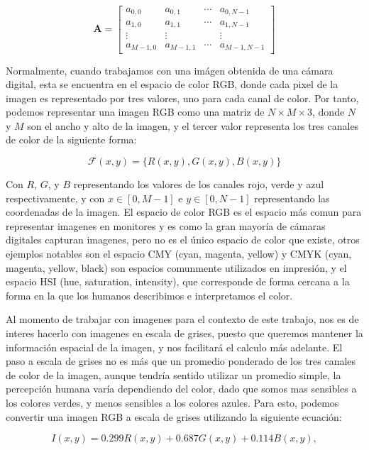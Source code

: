 $$
\mathbf{A}=\left[\begin{array}{cccc}
a_{0,0} & a_{0,1} & \cdots & a_{0, N-1} \\
a_{1,0} & a_{1,1} & \cdots & a_{1, N-1} \\
\vdots & \vdots & & \vdots \\
a_{M-1,0} & a_{M-1,1} & \cdots & a_{M-1, N-1}
\end{array}\right]
$$

Normalmente, cuando trabajamos con una im\'agen obtenida de una c\'amara digital, esta se encuentra en el espacio de color RGB, donde cada pixel de la imagen es representado por tres valores, uno para cada canal de color. Por tanto, podemos representar una imagen RGB como una matriz de $N \times M \times 3$, donde $N$ y $M$ son el ancho y alto de la imagen, y el tercer valor representa los tres canales de color de la siguiente forma:

$$
\mathcal{F}(x, y)=\{R(x, y), G(x, y), B(x, y)\}
$$


Con $R$, $G$, y $B$ representando los valores de los canales rojo, verde y azul respectivamente, y con $x\in[0,M-1]$ e $y\in[0,N-1]$ representando las coordenadas de la imagen. El espacio de color RGB es el espacio m\'as comun para representar imagenes en monitores y es como la gran mayoría de c\'amaras digitales capturan imagenes, pero no es el \'unico espacio de color que existe, otros ejemplos notables son el espacio CMY (cyan, magenta, yellow) y CMYK (cyan, magenta, yellow, black) son espacios comunmente utilizados en impresi\'on, y el espacio HSI (hue, saturation, intensity), que corresponde de forma cercana a la forma en la que los humanos describimos e interpretamos el color. \cite{DigitalImageProcessing}

Al momento de trabajar con imagenes para el contexto de este trabajo, nos es de interes hacerlo con imagenes en escala de grises, puesto que queremos mantener la informaci\'on espacial de la imagen, y nos facilitar\'a el calculo m\'as adelante. El paso a escala de grises no es más que un promedio ponderado de los tres canales de color de la imagen, aunque tendría sentido utilizar un promedio simple, la percepción humana varía dependiendo del color, dado que somos mas sensibles a los colores verdes, y menos sensibles a los colores azules. Para esto, podemos convertir una imagen RGB a escala de grises utilizando la siguiente ecuaci\'on:

\begin{equation}
    I(x, y)=0.299 R(x, y)+0.687 G(x, y)+0.114 B(x, y), 
    \label{eq:grayscale}
\end{equation}


